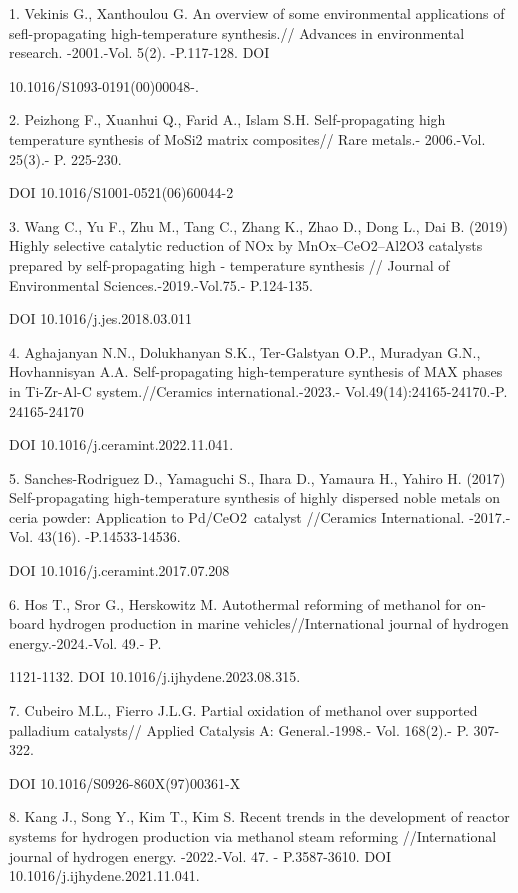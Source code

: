 \begin{noparindent}
1. Vekinis G., Xanthoulou G. An overview of some environmental
applications of sefl-propagating high-temperature synthesis.// Advances
in environmental research. -2001.-Vol. 5(2). -P.117-128. DOI

10.1016/S1093-0191(00)00048-.

2. Peizhong F., Xuanhui Q., Farid A., Islam S.H. Self-propagating high
temperature synthesis of MoSi2 matrix composites// Rare metals.-
2006.-Vol. 25(3).- P. 225-230.

DOI 10.1016/S1001-0521(06)60044-2

3. Wang C., Yu F., Zhu M., Tang C., Zhang K., Zhao D., Dong L., Dai B.
(2019) Highly selective catalytic reduction of NOx by MnOx--CeO2--Al2O3
catalysts prepared by self-propagating high - temperature
synthesis // Journal of Environmental Sciences.-2019.-Vol.75.- P.124-135.

DOI 10.1016/j.jes.2018.03.011

4. Aghajanyan N.N., Dolukhanyan S.K., Ter-Galstyan O.P., Muradyan G.N.,
Hovhannisyan A.A. Self-propagating high-temperature synthesis of MAX
phases in Ti-Zr-Al-C system.//Ceramics international.-2023.-
Vol.49(14):24165-24170.-P. 24165-24170

DOI 10.1016/j.ceramint.2022.11.041.

5. Sanches-Rodriguez D., Yamaguchi S., Ihara D., Yamaura H., Yahiro H.
(2017) Self-propagating high-temperature synthesis of highly dispersed
noble metals on ceria powder: Application to Pd/CeO2~catalyst //Ceramics
International. -2017.- Vol. 43(16). -P.14533-14536.

DOI 10.1016/j.ceramint.2017.07.208

6. Hos T., Sror G., Herskowitz M. Autothermal reforming of methanol for
on-board hydrogen production in marine vehicles//International journal
of hydrogen energy.-2024.-Vol. 49.- P.

1121-1132. DOI 10.1016/j.ijhydene.2023.08.315.

7. Cubeiro M.L., Fierro J.L.G. Partial oxidation of methanol over
supported palladium catalysts// Applied Catalysis A: General.-1998.-
Vol. 168(2).- P. 307-322.

DOI 10.1016/S0926-860X(97)00361-X

8. Kang J., Song Y., Kim T., Kim S. Recent trends in the development of
reactor systems for hydrogen production via methanol steam reforming
//International journal of hydrogen energy. -2022.-Vol. 47. -
P.3587-3610. DOI 10.1016/j.ijhydene.2021.11.041.


\end{noparindent}
